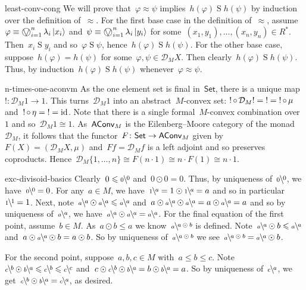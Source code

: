 \begin{solution}{least-conv-cong}
We will prove that~$\varphi \approx \psi$
    implies~$h(\varphi) \mathrel{S} h(\psi)$
    by induction over the definition of~$\approx$.
For the first base case in the definition of~$\approx$,
    assume~$\varphi \equiv \bigovee^n_{i=1} \lambda_i \ket{x_i}$
and~$\psi \equiv \bigovee^n_{i=1} \lambda_i \ket{y_i}$
for some~$(x_1,y_1), \ldots, (x_n,y_n) \in R^*$.
Then~$x_i \mathrel{S} y_i$
    and so~$\varphi \mathrel{S} \psi$,
    hence~$h(\varphi) \mathrel{S} h(\psi)$.
For the other base case, suppose~$h(\varphi) = h(\psi)$
    for some~$\varphi,\psi \in \mathcal{D}_M X$.
Then clearly~$h(\varphi) \mathrel{S} h(\psi)$.
Thus, by induction~$h(\varphi) \mathrel{S} h(\psi)$
    whenever~$\varphi \approx \psi$. 
\end{solution}
\begin{solution}{n-times-one-aconvm}%
As the one element set is final in~$\mathsf{Set}$,
    there is a unique map~$!\colon \mathcal{D}_M 1 \to 1$.
        This turns~$\mathcal{D}_M 1$ into an abstract~$M$-convex set:
        ${!} \mathop{\circ} \mathcal{D}_M {!} = {!} = {!} \mathop{\circ} \mu$
        and~${!} \mathop{\circ} \eta = {!} = \mathrm{id}$.
Note that there is a single formal~$M$-convex combination over~$1$
    and so~$\mathcal{D}_M 1 \cong 1$.
As~$\mathsf{AConv}_M$ is the Eilenberg--Moore category
    of the monad~$\mathcal{D}_M$,
    it follows that the functor~$F\colon \mathsf{Set} \to \mathsf{AConv}_M$
    given by~$F(X) = (\mathcal{D}_M X, \mu)$
    and~$Ff = \mathcal{D}_M f$ is a left adjoint
    and so preserves coproducts.
    Hence~$\mathcal{D}_M \{1,\ldots,n\}
                \cong F(n\cdot 1)
                \cong n \cdot F(1)
                \cong n \cdot 1$.
\end{solution}
\begin{solution}{exc-divisoid-basics}%
    Clearly~$0 \leq \rfrac{0}{0}$
        and~$0\odot 0 = 0$.
        Thus, by uniqueness of~$\rfrac{0}{0}$,
            we have~$\rfrac{0}{0}=0$.
For any~$a \in M$,
    we have~$\rfrac{a}{1} = 1 \odot \rfrac{a}{1} = a$
        and so in particular~$\rfrac{1}{1}=1$.
Next, note~$\rfrac{a}{a} \odot \rfrac{a}{a} \leq \rfrac{a}{a}$
    and~$a \odot \rfrac{a}{a} \odot \rfrac{a}{a} = a \odot \rfrac{a}{a} = a$
        and so by uniqueness of~$\rfrac{a}{a}$,
            we have~$\rfrac{a}{a}\odot \rfrac{a}{a} = \rfrac{a}{a}$.
For the final equation of the first point, assume~$b \in M$.
    As~$a \odot b \leq a$ we know~$\rfrac{a\odot b}{a}$ is defined.
Note~$\rfrac{a}{a} \odot b \leq \rfrac{a}{a}$
    and~$a \odot \rfrac{a}{a} \odot b = a \odot b$.
    So by uniqueness of~$ \rfrac{a\odot b}{a}$
    we see~$ \rfrac{a\odot b}{a}
    = \rfrac{a}{a} \odot b$.

For the second point, suppose~$a,b,c \in M$ with~$a \leq b \leq c$.
    Note~$\rfrac{b}{c} \odot \rfrac{a}{b} \leq \rfrac{b}{c} \leq \rfrac{c}{c}$
        and~$c \odot \rfrac{b}{c} \odot \rfrac{a}{b}
            = b\odot \rfrac{a}{b} = a $.
    So by uniqueness of~$\rfrac{a}{c}$,
        we get~$\rfrac{b}{c} \odot \rfrac{a}{b} = \rfrac{a}{c}$, as desired.
\end{solution}

